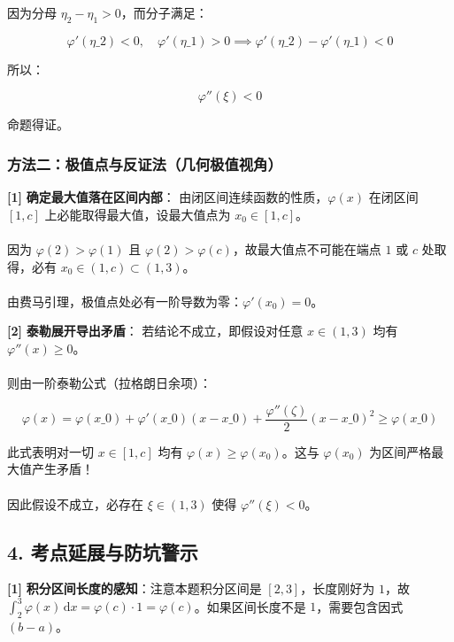\documentclass[11pt,a4paper,UTF8]{ctexart}
\begin{document}
\begin{solbox}[分步推导与答题规范]
因为分母 $\eta_2 - \eta_1 > 0$，而分子满足：

\begin{equation*}
\varphi'(\eta\_2) < 0,\quad \varphi'(\eta\_1) > 0 \implies \varphi'(\eta\_2) - \varphi'(\eta\_1) < 0
\end{equation*}

所以：

\begin{equation*}
\varphi''(\xi) < 0
\end{equation*}

命题得证。
\end{solbox}


\subsubsection{方法二：极值点与反证法（几何极值视角）}
\begin{solbox}[分步推导与答题规范]
\textbf{[1]}  \textbf{确定最大值落在区间内部}：
由闭区间连续函数的性质，$\varphi(x)$ 在闭区间 $[1, c]$ 上必能取得最大值，设最大值点为 $x_0 \in [1, c]$。\\ \\
因为 $\varphi(2) > \varphi(1)$ 且 $\varphi(2) > \varphi(c)$，故最大值点不可能在端点 $1$ 或 $c$ 处取得，必有 $x_0 \in (1, c) \subset (1, 3)$。\\ \\
由费马引理，极值点处必有一阶导数为零：$\varphi'(x_0) = 0$。

\textbf{[2]}  \textbf{泰勒展开导出矛盾}：
若结论不成立，即假设对任意 $x \in (1, 3)$ 均有 $\varphi''(x) \ge 0$。\\ \\
则由一阶泰勒公式（拉格朗日余项）：

\begin{equation*}
\varphi(x) = \varphi(x\_0) + \varphi'(x\_0)(x - x\_0) + \frac{\varphi''(\zeta)}{2}(x - x\_0)^2 \ge \varphi(x\_0)
\end{equation*}

此式表明对一切 $x \in [1, c]$ 均有 $\varphi(x) \ge \varphi(x_0)$。这与 $\varphi(x_0)$ 为区间严格最大值产生矛盾！\\ \\
因此假设不成立，必存在 $\xi \in (1, 3)$ 使得 $\varphi''(\xi) < 0$。
\end{solbox}


\subsection{4. 考点延展与防坑警示}
\begin{solbox}[分步推导与答题规范]
\textbf{[1]}  \textbf{积分区间长度的感知}：注意本题积分区间是 $[2, 3]$，长度刚好为 $1$，故 $\int_2^3 \varphi(x)\,\mathrm{d}x = \varphi(c) \cdot 1 = \varphi(c)$。如果区间长度不是 $1$，需要包含因式 $(b-a)$。
\end{solbox}
\end{document}
